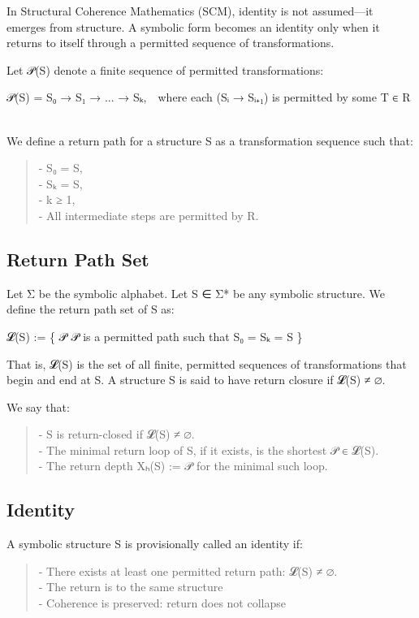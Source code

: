 In Structural Coherence Mathematics (SCM), identity is not assumed---it
emerges from structure. A symbolic form becomes an identity only when it
returns to itself through a permitted sequence of transformations.

Let 𝒫(S) denote a finite sequence of permitted transformations:

𝒫(S) = S₀ → S₁ → ... → Sₖ, where each (Sᵢ → Sᵢ₊₁) is permitted by some T
∈ R\\
\strut \\
We define a return path for a structure S as a transformation sequence
such that:

\begin{quote}
- S₀ = S,\\
- Sₖ = S,\\
- k ≥ 1,\\
- All intermediate steps are permitted by R.
\end{quote}

\subsection{Return Path Set}\label{return-path-set}

Let Σ be the symbolic alphabet. Let S ∈ Σ* be any symbolic structure. We
define the return path set of S as:

𝓛(S) := \{ 𝒫 \textbar{} 𝒫 is a permitted path such that S₀ = Sₖ = S \}

That is, 𝓛(S) is the set of all finite, permitted sequences of
transformations that begin and end at S. A structure S is said to have
return closure if 𝓛(S) ≠ ∅.

We say that:

\begin{quote}
- S is return-closed if 𝓛(S) ≠ ∅.\\
- The minimal return loop of S, if it exists, is the shortest 𝒫 ∈
𝓛(S).\\
- The return depth Xₕ(S) := \textbar 𝒫\textbar{} for the minimal such
loop.
\end{quote}

\subsection{Identity}\label{identity}

A symbolic structure S is provisionally called an identity if:

\begin{quote}
- There exists at least one permitted return path: 𝓛(S) ≠ ∅.\\
- The return is to the same structure\\
- Coherence is preserved: return does not collapse
\end{quote}

